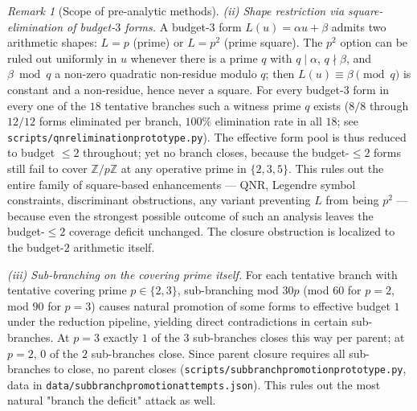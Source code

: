 \documentclass[11pt]{article}
\renewcommand{\_}{\origunderscore\allowbreak}
\theoremstyle{definition}
\theoremstyle{remark}
\newtheorem{remark}[theorem]{Remark}
\begin{document}
\begin{remark}[Scope of pre-analytic methods]
\emph{(ii) Shape restriction via square-elimination of budget-$3$
forms.} A budget-$3$ form $L(u) = \alpha u + \beta$ admits two
arithmetic shapes: $L = p$ (prime) or $L = p^2$ (prime square). The
$p^2$ option can be ruled out uniformly in $u$ whenever there is a
prime $q$ with $q \mid \alpha$, $q \nmid \beta$, and
$\beta \bmod q$ a non-zero quadratic non-residue modulo $q$; then
$L(u) \equiv \beta \pmod q$ is constant and a non-residue, hence
never a square. For every budget-$3$ form in every one of the $18$
tentative branches such a witness prime $q$ exists ($8/8$ through
$12/12$ forms eliminated per branch, $100\%$ elimination rate in all
$18$; see
\texttt{scripts/qnr\_elimination\_prototype.py}). The effective form
pool is thus reduced to budget $\le 2$ throughout; yet no branch
closes, because the budget-$\le 2$ forms still fail to cover
$\mathbb{Z}/p\mathbb{Z}$ at any operative prime in $\{2, 3, 5\}$.
This rules out the entire family of square-based enhancements —
QNR, Legendre symbol constraints, discriminant obstructions, any
variant preventing $L$ from being $p^2$ — because even the strongest
possible outcome of such an analysis leaves the budget-$\le 2$
coverage deficit unchanged. The closure obstruction is localized to
the budget-$2$ arithmetic itself.

\emph{(iii) Sub-branching on the covering prime itself.} For each
tentative branch with tentative covering prime
$p \in \{2, 3\}$, sub-branching mod $30p$ (mod $60$ for $p = 2$,
mod $90$ for $p = 3$) causes natural promotion of some forms to
effective budget $1$ under the reduction pipeline, yielding direct
contradictions in certain sub-branches. At $p = 3$ exactly $1$ of
the $3$ sub-branches closes this way per parent; at $p = 2$, $0$ of
the $2$ sub-branches close. Since parent closure requires all
sub-branches to close, no parent closes
(\texttt{scripts/subbranch\_promotion\_prototype.py},
data in \texttt{data/subbranch\_promotion\_attempts.json}). This
rules out the most natural "branch the deficit" attack as well.


\end{remark}
\end{document}
